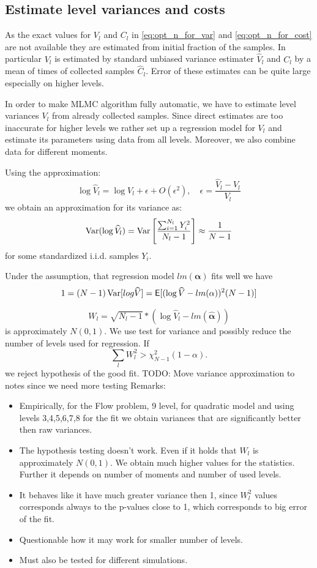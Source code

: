 \documentclass{article}
\def\vc#1{\mathbf{\boldsymbol{#1}}}     %
\def \E{{\mathsf E}}
\def\todo#1{{\color{red}TODO: #1}}
\def\Var{\mathop{\rm Var}}
\begin{document}
\subsection{Estimate level variances and costs}\label{est_var_cost}
\label{sec:VarEst}
As the exact values for $V_l$ and $C_l$ in \eqref{eq:opt_n_for_var} and \eqref{eq:opt_n_for_cost} are not available they are estimated from initial fraction of the samples. In particular $V_l$ is estimated by standard unbiased variance estimater $\widehat V_l$ and $C_l$ by a mean of times of collected samples 
$\widehat C_l$. Error of these estimates can be quite large especially on higher levels. 



In order to make MLMC algorithm fully automatic, we have to estimate level variances $V_l$ from already collected samples. Since direct estimates are too inaccurate for higher levels we rather set up a regression model for $V_l$ and estimate its parameters using data from all levels. Moreover, we also combine data for different moments.


Using the approximation:
\[
 \log \widehat V_l = \log V_l + \epsilon + O(\epsilon^2), \quad \epsilon = \frac{\widehat V_l - V_l}{V_l}
\]
we obtain an approximation for its variance as:
\[
   \Var(\log \widehat V_l) = \Var\left[ \frac{\sum_{i=1}^{N_l} Y_i^2}{N_l -1}\right]  \approx \frac{1}{N-1}
\]
for some standardized i.i.d. samples $Y_i$.

Under the assumption, that regression model $lm(\vc \alpha)$ fits well we have 
\[
 1 = (N-1) \Var[log \widehat V] = \E[ (\log \widehat V - lm(\alpha))^2 (N-1) ] 
\]


\[
  W_l = \sqrt{N_l-1}*(\log \widehat V_l - lm(\widehat{\vc\alpha}))
\]  
  is approximately $N(0,1)$. We use test for variance and possibly 
reduce the number of levels used for regression. If
\[
  \sum_l W_l^2 > \chi^2_{N-1}(1-\alpha). 
\]
we reject hypothesis of the good fit.
\todo{Move variance approximation to notes since we need more testing}
Remarks:
\begin{itemize}
 \item Empirically, for the Flow problem, 9 level, for quadratic model and using levels 3,4,5,6,7,8 for the fit we obtain variances that are significantly better then raw variances.
 \item The hypothesis testing doesn't work. Even if it holds that $W_l$ is approximately $N(0,1)$.
 We obtain much higher values for the statistics. Further it depends on number of moments and number of used levels. 
 \item It behaves like it have much greater variance then 1, since $W_l^2$ values corresponds always to the p-values close to 1, which corresponds to big error of the fit.
 \item Questionable how it may work for smaller number of levels.
 \item Must also be tested for different simulations.
\end{itemize}
\end{document}
